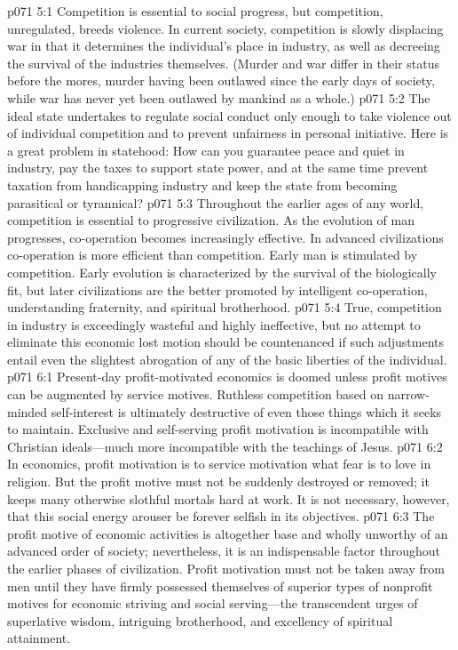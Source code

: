 \vs p071 5:1 Competition is essential to social progress, but competition, unregulated, breeds violence. In current society, competition is slowly displacing war in that it determines the individual’s place in industry, as well as decreeing the survival of the industries themselves. (Murder and war differ in their status before the mores, murder having been outlawed since the early days of society, while war has never yet been outlawed by mankind as a whole.)
\vs p071 5:2 The ideal state undertakes to regulate social conduct only enough to take violence out of individual competition and to prevent unfairness in personal initiative. Here is a great problem in statehood: How can you guarantee peace and quiet in industry, pay the taxes to support state power, and at the same time prevent taxation from handicapping industry and keep the state from becoming parasitical or tyrannical?\plusone
\vs p071 5:3 Throughout the earlier ages of any world, competition is essential to progressive civilization. As the evolution of man progresses, co\hyp{}operation becomes increasingly effective. In advanced civilizations co\hyp{}operation is more efficient than competition. Early man is stimulated by competition. Early evolution is characterized by the survival of the biologically fit, but later civilizations are the better promoted by intelligent co\hyp{}operation, understanding fraternity, and spiritual brotherhood.
\vs p071 5:4 True, competition in industry is exceedingly wasteful and highly ineffective, but no attempt to eliminate this economic lost motion should be countenanced if such adjustments entail even the slightest abrogation of any of the basic liberties of the individual.
\vs p071 6:1 Present\hyp{}day profit\hyp{}motivated economics is doomed unless profit motives can be augmented by service motives. Ruthless competition based on narrow\hyp{}minded self\hyp{}interest is ultimately destructive of even those things which it seeks to maintain. Exclusive and self\hyp{}serving profit motivation is incompatible with Christian ideals---much more incompatible with the teachings of Jesus.
\vs p071 6:2 In economics, profit motivation is to service motivation what fear is to love in religion. But the profit motive must not be suddenly destroyed or removed; it keeps many otherwise slothful mortals hard at work. It is not necessary, however, that this social energy arouser be forever selfish in its objectives.
\vs p071 6:3 The profit motive of economic activities is altogether base and wholly unworthy of an advanced order of society; nevertheless, it is an indispensable factor throughout the earlier phases of civilization. Profit motivation must not be taken away from men until they have firmly possessed themselves of superior types of nonprofit motives for economic striving and social serving---the transcendent urges of superlative wisdom, intriguing brotherhood, and excellency of spiritual attainment.\plusone
